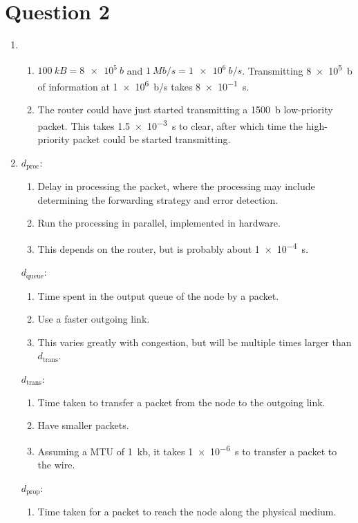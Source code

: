 \documentclass{article}
\begin{document}
\section*{Question 2}
\begin{enumerate}
  \item
    \begin{enumerate}
      \item $\SI{100}{kB} = \SI{8e5}{b}$ and $\SI{1}{Mb/s} = \SI{1e6}{b/s}$. Transmitting \SI{8e5}{b} of information at \SI{1e6}{b/s} takes \SI{8e-1}{s}.
      \item The router could have just started transmitting a \SI{1500}{b} low-priority packet. This takes \SI{1.5e-3}{s} to clear, after which time the high-priority packet could be started transmitting.
    \end{enumerate}
  \item
    $d_{\mathrm{proc}}$:
    \begin{enumerate}
      \item Delay in processing the packet, where the processing may include determining the forwarding strategy and error detection.
      \item Run the processing in parallel, implemented in hardware.
      \item This depends on the router, but is probably about \SI{1e-4}{s}.
    \end{enumerate}
    $d_{\mathrm{queue}}$:
    \begin{enumerate}
      \item Time spent in the output queue of the node by a packet.
      \item Use a faster outgoing link.
      \item This varies greatly with congestion, but will be multiple times larger than $d_{\mathrm{trans}}$.
    \end{enumerate}
    $d_{\mathrm{trans}}$:
    \begin{enumerate}
      \item Time taken to transfer a packet from the node to the outgoing link.
      \item Have smaller packets.
      \item Assuming a MTU of \SI{1}{kb}, it takes \SI{1e-6}{s} to transfer a packet to the wire.
    \end{enumerate}
    $d_{\mathrm{prop}}$:
    \begin{enumerate}
      \item Time taken for a packet to reach the node along the physical medium.

\end{enumerate}
\end{enumerate}
\end{document}
